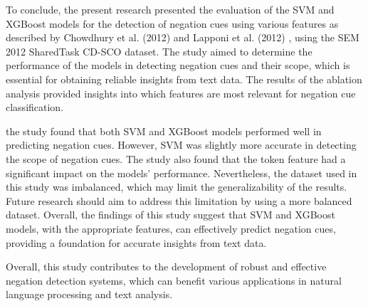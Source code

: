 To conclude, the present research presented the evaluation of the SVM and XGBoost models for the detection of negation cues using various features as described by Chowdhury et al. (2012) and Lapponi et al. (2012) \cite{chowdhury2012fbk, lapponi2012uio}, using the SEM 2012 SharedTask CD-SCO dataset. The study aimed to determine the performance of the models in detecting negation cues and their scope, which is essential for obtaining reliable insights from text data. The results of the ablation analysis provided insights into which features are most relevant for negation cue classification.


the study found that both SVM and XGBoost models performed well in predicting negation cues. However, SVM was slightly more accurate in detecting the scope of negation cues. The study also found that the token feature had a significant impact on the models' performance. Nevertheless, the dataset used in this study was imbalanced, which may limit the generalizability of the results. Future research should aim to address this limitation by using a more balanced dataset. Overall, the findings of this study suggest that SVM and XGBoost models, with the appropriate features, can effectively predict negation cues, providing a foundation for accurate insights from text data.


Overall, this study contributes to the development of robust and effective negation detection systems, which can benefit various applications in natural language processing and text analysis.